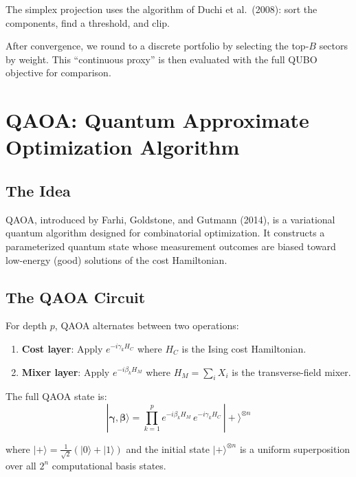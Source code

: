 \documentclass[12pt, a4paper]{article}
\begin{document}
The simplex projection uses the algorithm of Duchi et al.\ (2008): sort the
components, find a threshold, and clip.

After convergence, we round to a discrete portfolio by selecting the top-$B$
sectors by weight. This ``continuous proxy'' is then evaluated with the full
QUBO objective for comparison.


\section{QAOA: Quantum Approximate Optimization Algorithm}

\subsection{The Idea}

QAOA, introduced by Farhi, Goldstone, and Gutmann (2014), is a variational
quantum algorithm designed for combinatorial optimization. It constructs a
parameterized quantum state whose measurement outcomes are biased toward
low-energy (good) solutions of the cost Hamiltonian.

\subsection{The QAOA Circuit}

For depth $p$, QAOA alternates between two operations:

\begin{enumerate}
    \item \textbf{Cost layer}: Apply $e^{-i \gamma_k H_C}$ where $H_C$ is the Ising cost Hamiltonian.
    \item \textbf{Mixer layer}: Apply $e^{-i \beta_k H_M}$ where $H_M = \sum_i X_i$ is the transverse-field mixer.
\end{enumerate}

The full QAOA state is:
\begin{equation}
\boxed{
|\bm{\gamma}, \bm{\beta}\rangle
= \prod_{k=1}^{p} e^{-i \beta_k H_M}\, e^{-i \gamma_k H_C}\, |+\rangle^{\otimes n}
}
\label{eq:qaoa_state}
\end{equation}

where $|+\rangle = \frac{1}{\sqrt{2}}(|0\rangle + |1\rangle)$ and the initial
state $|+\rangle^{\otimes n}$ is a uniform superposition over all $2^n$
computational basis states.
\end{document}
